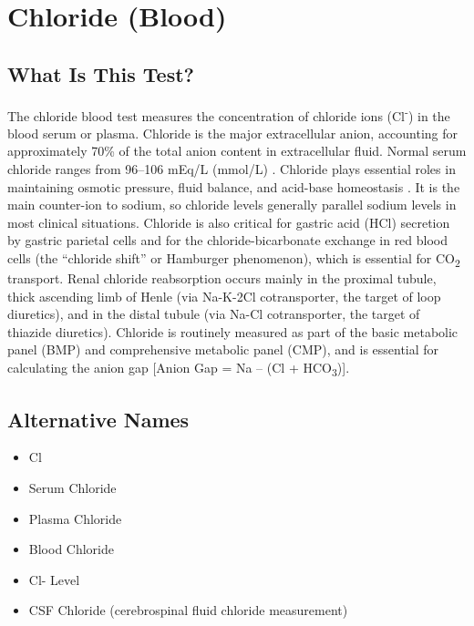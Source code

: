 \chapter{Chloride (Blood)}

\section*{What Is This Test?}
The chloride blood test measures the concentration of chloride ions (Cl\textsuperscript{-}) in the blood serum or plasma. Chloride is the major extracellular anion, accounting for approximately 70\% of the total anion content in extracellular fluid. Normal serum chloride ranges from 96--106 mEq/L (mmol/L) \cite{wallach2022interpretation}. Chloride plays essential roles in maintaining osmotic pressure, fluid balance, and acid-base homeostasis \cite{tierney2023current}. It is the main counter-ion to sodium, so chloride levels generally parallel sodium levels in most clinical situations. Chloride is also critical for gastric acid (HCl) secretion by gastric parietal cells and for the chloride-bicarbonate exchange in red blood cells (the ``chloride shift'' or Hamburger phenomenon), which is essential for CO\textsubscript{2} transport. Renal chloride reabsorption occurs mainly in the proximal tubule, thick ascending limb of Henle (via Na-K-2Cl cotransporter, the target of loop diuretics), and in the distal tubule (via Na-Cl cotransporter, the target of thiazide diuretics). Chloride is routinely measured as part of the basic metabolic panel (BMP) and comprehensive metabolic panel (CMP), and is essential for calculating the anion gap [Anion Gap = Na -- (Cl + HCO\textsubscript{3})].

\section*{Alternative Names}
\begin{itemize}
  \item Cl
  \item Serum Chloride
  \item Plasma Chloride
  \item Blood Chloride
  \item Cl- Level
  \item CSF Chloride (cerebrospinal fluid chloride measurement)
\end{itemize}
